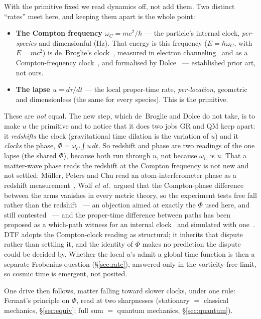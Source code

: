 \documentclass[11pt]{article}
\begin{document}
With the primitive fixed we read dynamics off, not add them. Two distinct ``rates'' meet here, and keeping them
apart is the whole point:
\begin{itemize}[leftmargin=1.4em,itemsep=2pt,topsep=2pt]
\item \textbf{The Compton frequency $\omega_C=mc^2/\hbar$} --- the particle's internal clock, \emph{per-species}
  and dimensionful (Hz). That energy is this frequency ($E=\hbar\omega_C$, with $E=mc^2$) is de~Broglie's
  clock~\cite{deBroglie1925}, measured in electron channeling~\cite{Catillon2008} and as a Compton-frequency
  clock~\cite{Lan2013}, and formalised by Dolce~\cite{Dolce2011} --- established prior art, not ours.
\item \textbf{The lapse $u=d\tau/dt$} --- the local proper-time rate, \emph{per-location}, geometric and
  dimensionless (the same for every species). This is the primitive.
\end{itemize}
These are \emph{not} equal. The new step, which de~Broglie and Dolce do not take, is to make $u$ the primitive and to notice that it does two jobs GR and QM keep apart: it \emph{redshifts} the clock (gravitational time
dilation is the variation of $u$) and it \emph{clocks} the phase, $\Phi=\omega_C\!\int u\,dt$. So redshift and phase are two readings of the one lapse (the shared $\Phi$), because both run through $u$, not because
$\omega_C$ is $u$. That a matter-wave phase reads the redshift at the Compton frequency is not new and not
settled: M\"uller, Peters and Chu read an atom-interferometer phase as a redshift measurement~\cite{MuellerPetersChu2010},
Wolf \emph{et al.}\ argued that the Compton-phase difference between the arms vanishes in every metric theory,
so the experiment tests free fall rather than the redshift~\cite{Wolf2010,Wolf2011} --- an objection aimed at
exactly the $\Phi$ used here, and still contested~\cite{Hohensee2012} --- and the proper-time difference
between paths has been proposed as a which-path witness for an internal clock~\cite{Zych2011} and simulated with one~\cite{Margalit2015}.
DTF adopts the Compton-clock reading as structural; it inherits that dispute rather than settling it, and the
identity of $\Phi$ makes no prediction the dispute could be decided by. Whether the local $u$'s admit a global time function is then a separate Frobenius question
(\S\ref{sec:rate}), answered only in the vorticity-free limit, so cosmic time is emergent, not posited.

One drive then follows, matter falling toward slower clocks, under one rule: Fermat's principle on $\Phi$,
read at two sharpnesses (stationary $=$ classical mechanics, \S\ref{sec:equiv}; full sum $=$ quantum mechanics, \S\ref{sec:quantum}).
\end{document}
